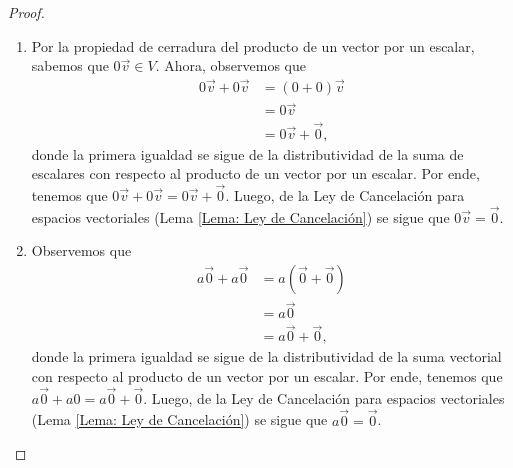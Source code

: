 \documentclass[notasLineal]{subfiles}
\begin{document}
\begin{proof}\leavevmode
    \begin{enumerate}[label=(\alph*)]

        \item Por la propiedad de cerradura del producto de un vector por un escalar, sabemos que $0\vec{v}\in V$. Ahora, observemos que
            \begin{align*}
                0\vec{v}+0\vec{v}&=(0+0)\vec{v} \tag{distributividad} \\
                                       &=0\vec{v} \\
                                       &=0\vec{v}+\vec{0} \tag{neutro aditivo},
            \end{align*}
            donde la primera igualdad se sigue de la distributividad de la suma de escalares con respecto al producto de un vector por un escalar. Por ende, tenemos que $0\vec{v}+0\vec{v} =0\vec{v}+\vec{0}$. Luego, de la Ley de Cancelación para espacios vectoriales (Lema \ref{Lema: Ley de Cancelación}) se sigue que $0\vec{v}=\vec{0}$.

        \item Observemos que
            \begin{align*}
                a\vec{0}+a\vec{0}&=a(\vec{0}+\vec{0}) \\
                                       &=a\vec{0}\\
                                       &=a\vec{0}+\vec{0},
            \end{align*}
            donde la primera igualdad se sigue de la distributividad de la suma vectorial con respecto al producto de un vector por un escalar. Por ende, tenemos que $a\vec{0}+a0\mathbf{}=a\vec{0}+\vec{0}$. Luego, de la Ley de Cancelación para espacios vectoriales (Lema \ref{Lema: Ley de Cancelación}) se sigue que $a\vec{0}=\vec{0}$.


\end{enumerate}
\end{proof}
\end{document}
